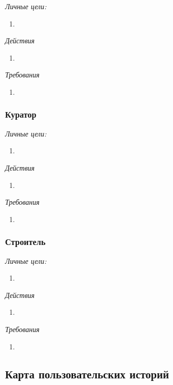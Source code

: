 \documentclass[a4paper,14pt]{extreport} %
\begin{document}
\textit{Личные цели:}
\begin{enumerate}
\item 
\end{enumerate}

\textit{Действия}
\begin{enumerate}
\item 
\end{enumerate}

\textit{Требования}
\begin{enumerate}
\item 
\end{enumerate}

\subsubsection{Куратор}

\textit{Личные цели:}
\begin{enumerate}
\item 
\end{enumerate}

\textit{Действия}
\begin{enumerate}
\item 
\end{enumerate}

\textit{Требования}
\begin{enumerate}
\item 
\end{enumerate}

\subsubsection{Строитель}

\textit{Личные цели:}
\begin{enumerate}
\item 
\end{enumerate}

\textit{Действия}
\begin{enumerate}
\item 
\end{enumerate}

\textit{Требования}
\begin{enumerate}
\item 
\end{enumerate}

\subsection{Карта пользовательских историй}
\end{document}

